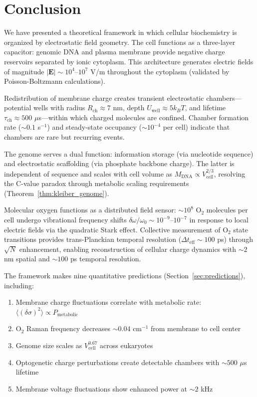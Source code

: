 \documentclass[twocolumn,10pt,aps,prd,superscriptaddress,floatfix,nofootinbib]{revtex4-2}
\theoremstyle{remark}
\begin{document}
\section{Conclusion}

We have presented a theoretical framework in which cellular biochemistry is organized by electrostatic field geometry. The cell functions as a three-layer capacitor: genomic DNA and plasma membrane provide negative charge reservoirs separated by ionic cytoplasm. This architecture generates electric fields of magnitude $|\mathbf{E}| \sim 10^4$--$10^7$ V/m throughout the cytoplasm (validated by Poisson-Boltzmann calculations).

Redistribution of membrane charge creates transient electrostatic chambers---potential wells with radius $R_{\mathrm{ch}} \approx 7$ nm, depth $U_{\mathrm{well}} \approx 5 k_B T$, and lifetime $\tau_{\mathrm{ch}} \approx 500$ $\mu$s---within which charged molecules are confined. Chamber formation rate ($\sim 0.1$ s$^{-1}$) and steady-state occupancy ($\sim 10^{-4}$ per cell) indicate that chambers are rare but recurring events.

The genome serves a dual function: information storage (via nucleotide sequence) and electrostatic scaffolding (via phosphate backbone charge). The latter is independent of sequence and scales with cell volume as $M_{\mathrm{DNA}} \propto V_{\mathrm{cell}}^{2/3}$, resolving the C-value paradox through metabolic scaling requirements (Theorem~\ref{thm:kleiber_genome}).

Molecular oxygen functions as a distributed field sensor: $\sim 10^8$ O$_2$ molecules per cell undergo vibrational frequency shifts $\delta\omega/\omega_0 \sim 10^{-9}$--$10^{-7}$ in response to local electric fields via the quadratic Stark effect. Collective measurement of O$_2$ state transitions provides trans-Planckian temporal resolution ($\Delta t_{\mathrm{eff}} \sim 100$ ps) through $\sqrt{N}$ enhancement, enabling reconstruction of cellular charge dynamics with $\sim 2$ nm spatial and $\sim 100$ ps temporal resolution.

The framework makes nine quantitative predictions (Section~\ref{sec:predictions}), including:
\begin{enumerate}
\item Membrane charge fluctuations correlate with metabolic rate: $\langle(\delta\sigma)^2\rangle \propto P_{\mathrm{metabolic}}$
\item O$_2$ Raman frequency decreases $\sim 0.04$ cm$^{-1}$ from membrane to cell center
\item Genome size scales as $V_{\mathrm{cell}}^{0.67}$ across eukaryotes
\item Optogenetic charge perturbations create detectable chambers with $\sim 500$ $\mu$s lifetime
\item Membrane voltage fluctuations show enhanced power at $\sim 2$ kHz
\end{enumerate}
\end{document}
